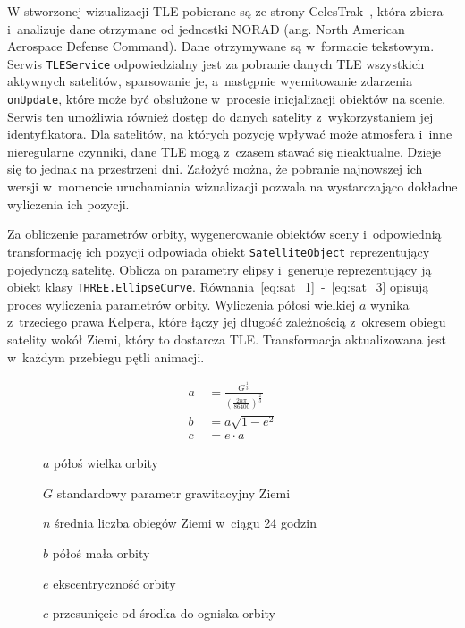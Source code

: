 W stworzonej wizualizacji TLE pobierane są ze strony CelesTrak~\cite{CelesTrak}, która zbiera i~analizuje dane otrzymane od jednostki NORAD (ang. North American Aerospace Defense Command). Dane otrzymywane są w~formacie tekstowym. Serwis \texttt{TLEService} odpowiedzialny jest za pobranie danych TLE wszystkich aktywnych satelitów, sparsowanie je, a~następnie wyemitowanie zdarzenia \texttt{onUpdate}, które może być obsłużone w~procesie inicjalizacji obiektów na scenie. Serwis ten umożliwia również dostęp do danych satelity z~wykorzystaniem jej identyfikatora. Dla satelitów, na których pozycję wpływać może atmosfera i~inne nieregularne czynniki, dane TLE mogą z~czasem stawać się nieaktualne. Dzieje się to jednak na przestrzeni dni. Założyć można, że pobranie najnowszej ich wersji w~momencie uruchamiania wizualizacji pozwala na wystarczająco dokładne wyliczenia ich pozycji.

Za obliczenie parametrów orbity, wygenerowanie obiektów sceny i~odpowiednią transformację ich pozycji odpowiada obiekt \texttt{SatelliteObject} reprezentujący pojedynczą satelitę. Oblicza on parametry elipsy i~generuje reprezentujący ją obiekt klasy \texttt{THREE.EllipseCurve}. Równania~\ref{eq:sat_1}~-~\ref{eq:sat_3} opisują proces wyliczenia parametrów orbity. Wyliczenia półosi wielkiej $a$ wynika z~trzeciego prawa Kelpera, które łączy jej długość zależnością z~okresem obiegu satelity wokół Ziemi, który to dostarcza TLE. Transformacja aktualizowana jest w~każdym przebiegu pętli animacji.

\begin{samepage}
  \begin{figure}[h]
  \begin{align}
      \label{eq:sat_1}
      a~&= \frac{G^{\frac{1}{3}}}{(\frac{2n\pi}{86400})^{\frac{2}{3}}} \\
      \label{eq:sat_2}
      b &= a\sqrt{1-e^2} \\
      \label{eq:sat_3}
      c &= e \cdot a
  \end{align}
  \begin{eqexpl}[25mm]
      \item {$a$} półoś wielka orbity
      \item {$G$} standardowy parametr grawitacyjny Ziemi
      \item {$n$} średnia liczba obiegów Ziemi w~ciągu 24 godzin
      \item {$b$} półoś mała orbity
      \item {$e$} ekscentryczność orbity
      \item {$c$} przesunięcie od środka do ogniska orbity
  \end{eqexpl}
  \vspace{\baselineskip}
\end{figure}
\end{samepage}

